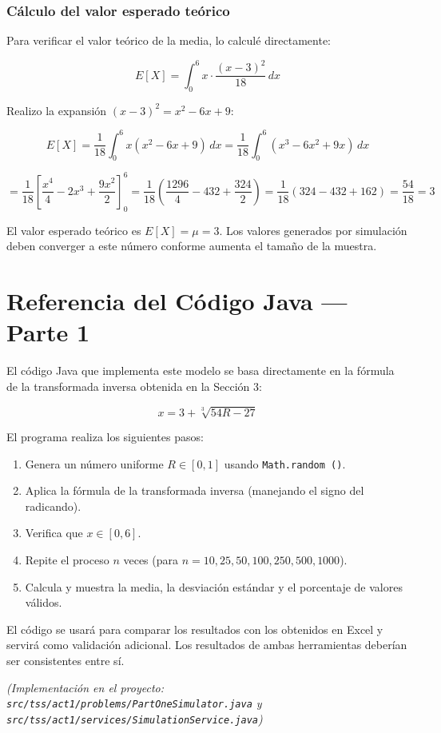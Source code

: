 \documentclass[12pt,a4paper]{article}
\begin{document}
\subsubsection{Cálculo del valor esperado teórico}

Para verificar el valor teórico de la media, lo calculé directamente:

\[
E[X] = \int_0^6 x \cdot \frac{(x-3)^2}{18}\, dx
\]

Realizo la expansión $(x-3)^2 = x^2 - 6x + 9$:

\[
E[X] = \frac{1}{18}\int_0^6 x(x^2 - 6x + 9)\, dx = \frac{1}{18}\int_0^6 (x^3 - 6x^2 + 9x)\, dx
\]

\[
= \frac{1}{18}\left[\frac{x^4}{4} - 2x^3 + \frac{9x^2}{2}\right]_0^6
= \frac{1}{18}\left(\frac{1296}{4} - 432 + \frac{324}{2}\right)
= \frac{1}{18}(324 - 432 + 162) = \frac{54}{18} = 3
\]

\begin{formulabox}
El valor esperado teórico es $E[X] = \mu = 3$. Los valores generados por simulación deben converger a este número conforme aumenta el tamaño de la muestra.
\end{formulabox}

\newpage

\section{Referencia del Código Java — Parte 1}

\begin{javabox}
El código Java que implementa este modelo se basa directamente en la fórmula de la transformada inversa obtenida en la Sección 3:

\[
x = 3 + \sqrt[3]{54R - 27}
\]

El programa realiza los siguientes pasos:
\begin{enumerate}
  \item Genera un número uniforme $R \in [0, 1]$ usando \texttt{Math.random ()}.
  \item Aplica la fórmula de la transformada inversa (manejando el signo del radicando).
  \item Verifica que $x \in [0, 6]$.
  \item Repite el proceso $n$ veces (para $n = 10, 25, 50, 100, 250, 500, 1000$).
  \item Calcula y muestra la media, la desviación estándar y el porcentaje de valores válidos.
\end{enumerate}

El código se usará para comparar los resultados con los obtenidos en Excel y servirá como validación adicional. Los resultados de ambas herramientas deberían ser consistentes entre sí.

\medskip
\textit{(Implementación en el proyecto: \texttt{src/tss/act1/problems/PartOneSimulator.java} y \texttt{src/tss/act1/services/SimulationService.java})}
\end{javabox}
\end{document}
